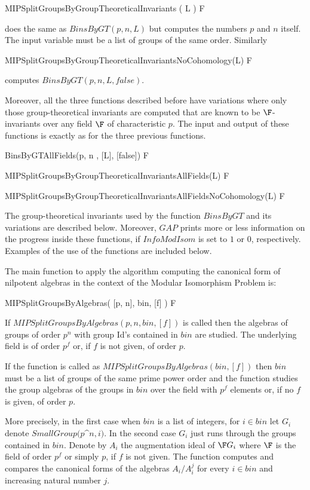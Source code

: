 \> MIPSplitGroupsByGroupTheoreticalInvariants ( L ) F

does the same as $BinsByGT(p,n,L)$ but computes the numbers $p$ and
$n$ itself. The input variable must be a list of groups of the same
order. Similarly

\> MIPSplitGroupsByGroupTheoreticalInvariantsNoCohomology(L) F	

computes $BinsByGT(p, n, L, false)$.


Moreover, all the three functions described before have variations
where only those group-theoretical invariants are computed that 
are known to be $\F$-invariants over any field $\F$ of 
characteristic $p$. The input and output of these functions is exactly 
as for the three previous functions.

\> BinsByGTAllFields(p, n , [L], [false]) F

\> MIPSplitGroupsByGroupTheoreticalInvariantsAllFields(L) F

\> MIPSplitGroupsByGroupTheoreticalInvariantsAllFieldsNoCohomology(L) F

The group-theoretical invariants used by the function
$BinsByGT$ and its variations are described below. 
Moreover, $GAP$ prints more or less information on the progress 
inside these functions, if $InfoModIsom$ is set to $1$ or $0$,
respectively. Examples of the use of the functions are included
below.

The main function to apply the algorithm computing the canonical
form of nilpotent algebras in the context of the Modular
Isomorphism Problem is:

\> MIPSplitGroupsByAlgebras( [p, n], bin, [f] ) F


If $MIPSplitGroupsByAlgebras(p, n, bin, [f])$ is called then the algebras
of groups of order $p^n$ with group Id's contained in $bin$ are studied.
The underlying field is of order $p^f$ or, if $f$ is not given, of 
order $p$. 

If the function is called as $MIPSplitGroupsByAlgebras(bin, [f])$ then
$bin$ must be a list of groups of the same prime power order and the function
studies the group algebras of the groups in $bin$ over the field with $p^f$
elements or, if no $f$ is given, of order $p$.

More precisely, in the first case when $bin$ is a list of integers,
for $i \in bin$ let $G_i$ denote $SmallGroup(p$^$n, i)$.
In the second case $G_i$ just runs through the groups contained in $bin$.
Denote by $A_i$ the augmentation ideal of $\F G_i$ where $\F$ is the field
of order $p^f$ or simply $p$, if $f$ is not given.
 The function computes and compares the canonical forms of the algebras 
 $A_i / A_i^j$ for every $i \in bin$ and increasing natural number $j$. 

